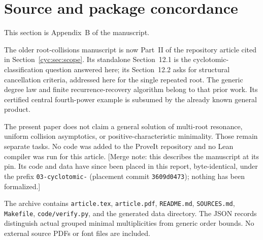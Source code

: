 \documentclass[11pt,a4paper]{article}
\numberwithin{equation}{section}
\theoremstyle{definition}
\theoremstyle{remark}
\begin{document}
\section{Source and package concordance}\label{cyc:app:concordance}

This section is Appendix~B of the manuscript.

The older root-collisions manuscript is now Part~II of the repository
article cited in Section~\ref{cyc:sec:scope}.  Its standalone Section~12.1
is the cyclotomic-classification question answered here; its
Section~12.2 asks for structural cancellation criteria, addressed here
for the single repeated root.  The generic degree law and finite
recurrence-recovery algorithm belong to that prior work.  Its
certified central fourth-power example is subsumed by the already
known general product.


The present paper does not claim a general solution of multi-root
resonance, uniform collision asymptotics, or positive-characteristic
minimality.  Those remain separate tasks.  No code was added to the
ProveIt repository and no Lean compiler was run for this article.
[Merge note: this describes the manuscript at its pin.  Its code and data
have since been placed in this report, byte-identical, under the prefix
\texttt{03-cyclotomic-} (placement commit \texttt{3609d0473}); nothing has
been formalized.]

The archive contains \nolinkurl{article.tex}, \nolinkurl{article.pdf},
\nolinkurl{README.md}, \nolinkurl{SOURCES.md}, \nolinkurl{Makefile},
\nolinkurl{code/verify.py}, and the generated data directory.  The JSON
records distinguish actual grouped minimal multiplicities from generic
order bounds.  No external source PDFs or font files are included.

\end{document}
